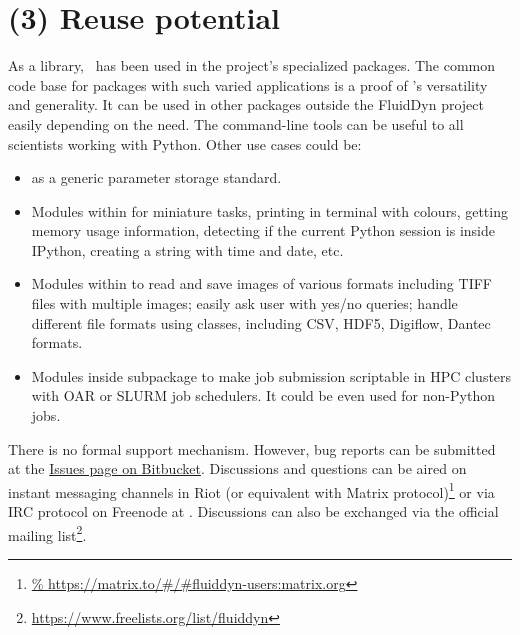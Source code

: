 \section{(3) Reuse potential}
%
%

As a library, \fluiddyn\ has been used in the project's specialized packages.
The common code base for packages with such varied applications is a proof of
\fluiddyn's versatility and generality. It can be used in other packages outside
the FluidDyn project easily depending on the need. The command-line tools can
be useful to all scientists working with Python. Other use cases could be:
\begin{itemize}
	\item {} as a generic parameter storage
		standard.
	\item Modules within  for miniature tasks,
		printing in terminal with colours, getting memory usage
		information, detecting if the current Python session is inside
		IPython, creating a string with time and date, etc.
	\item Modules within  to read
		and save images of various formats including TIFF files with
		multiple images; easily ask user with yes/no queries; handle
		different file formats using classes, including CSV, HDF5,
		Digiflow, Dantec formats.
	\item Modules inside  subpackage to
		make job submission scriptable in HPC clusters with OAR or
		SLURM job schedulers. It could be even used for non-Python
		jobs.
\end{itemize}


There is no formal support mechanism. However, bug reports can be submitted at the
\href{https://bitbucket.org/fluiddyn/fluiddyn/issues}{Issues page on Bitbucket}.
Discussions and questions can be aired on instant messaging channels in Riot (or
equivalent with Matrix protocol)\footnote{
\url{%
  https://matrix.to/\#/\#fluiddyn-users:matrix.org}}
or via IRC protocol on Freenode at . Discussions
can also be exchanged via the official mailing list\footnote{
\url{https://www.freelists.org/list/fluiddyn}}.

